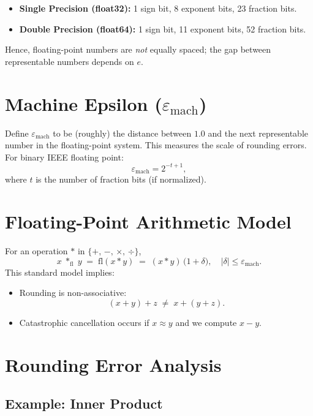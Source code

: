 \begin{itemize}
    \item \textbf{Single Precision (float32):} 1 sign bit, 8 exponent bits, 23 fraction bits.
    \item \textbf{Double Precision (float64):} 1 sign bit, 11 exponent bits, 52 fraction bits.
\end{itemize}

\noindent
Hence, floating-point numbers are \emph{not} equally spaced; the gap between representable numbers depends on $e$.

\section*{Machine Epsilon \texorpdfstring{($\varepsilon_{\mathrm{mach}}$)}{}}

Define $\varepsilon_{\mathrm{mach}}$ to be (roughly) the distance between $1.0$ and the next representable number in the floating-point system. This measures the scale of rounding errors. For binary IEEE floating point:
\[
\varepsilon_{\mathrm{mach}} = 2^{-t+1},
\]
where $t$ is the number of fraction bits (if normalized).

\section*{Floating-Point Arithmetic Model}

For an operation $*$ in $\{+,\,-,\,\times,\,\div\}$,
\[
x \;*_{\mathrm{fl}}\; y \;=\; \mathrm{fl}(x * y) \;=\; (x * y)\,\bigl(1 + \delta\bigr),
\quad
|\delta| \le \varepsilon_{\mathrm{mach}}.
\]
This standard model implies:

\begin{itemize}
    \item Rounding is non-associative:
    \[
      (x + y) + z \;\neq\; x + (y + z).
    \]
    \item Catastrophic cancellation occurs if $x \approx y$ and we compute $x - y$.
\end{itemize}

\section*{Rounding Error Analysis}

\subsection*{Example: Inner Product}

